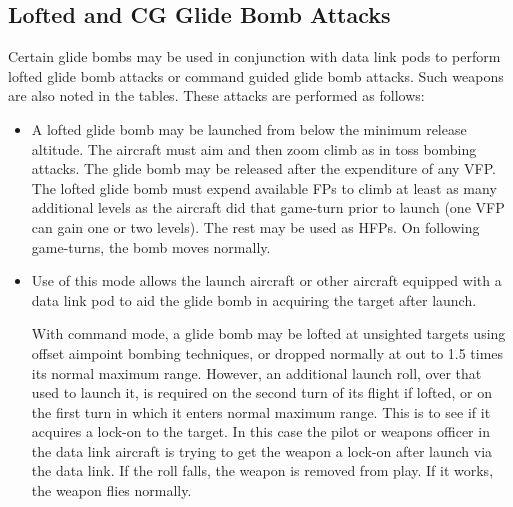 \subsection{Lofted and CG Glide Bomb Attacks} Certain glide bombs may be used in conjunction with data link pods to perform lofted glide bomb attacks or command guided glide bomb attacks. Such weapons are also noted in the tables. These attacks are performed as follows:

\begin{itemize}

    \item{} A lofted glide bomb may be launched from below the minimum release altitude. The aircraft must aim and then zoom climb as in toss bombing attacks. The glide bomb may be released after the expenditure of any VFP. The lofted glide bomb must expend available FPs to climb at least as many additional levels as the aircraft did that game-turn prior to launch (one VFP can gain one or two levels). The rest may be used as HFPs. On following game-turns, the bomb moves normally.

    \item{} Use of this mode allows the launch aircraft or other aircraft equipped with a data link pod to aid the glide bomb in acquiring the target after launch.

        With command mode, a glide bomb may be lofted at unsighted targets using offset aimpoint bombing techniques, or dropped normally at out to 1.5 times its normal maximum range. However, an additional launch roll, over that used to launch it, is required on the second turn of its flight if lofted, or on the first turn in which it enters normal maximum range. This is to see if it acquires a lock-on to the target. In this case the pilot or weapons officer in the data link aircraft is trying to get the weapon a lock-on after launch via the data link. If the roll falls, the weapon is removed from play. If it works, the weapon flies normally.

\end{itemize}


